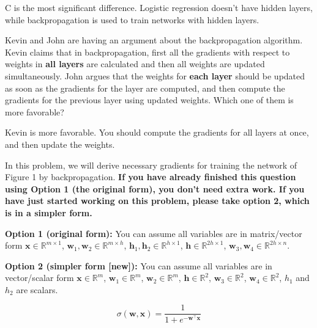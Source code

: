 \documentclass{article}
\newcommand{\R}{\mathbb{R}}
\newcommand{\x}{\mathbf{x}}
\newcommand{\w}{\mathbf{w}}
\newcommand{\h}{\mathbf{h}}
\begin{document}
\begin{probset}
\begin{prob}
\begin{subprobset}
\begin{subprob}
            \begin{soln}
                C is the most significant difference. Logistic regression doesn't have hidden layers, while backpropagation is used to train networks with hidden layers.
            \end{soln}
        \end{subprob}

        \begin{subprob}
            Kevin and John are having an argument about the backpropagation algorithm. Kevin claims that in backpropagation, first all the gradients with respect to weights in \textbf{all layers} are calculated and then all weights are updated simultaneously. John argues that the weights for \textbf{each layer} should be updated as soon as the gradients for the layer are computed, and then compute the gradients for the previous layer using updated weights. Which one of them is more favorable?

            \begin{soln}
                Kevin is more favorable. You should compute the gradients for all layers at once, and then update the weights.
            \end{soln}
        \end{subprob}
    \end{subprobset}
\end{prob}

\begin{prob}
    In this problem, we will derive necessary gradients for training the network of Figure 1 by backpropagation. \textbf{If you have already finished this question using Option 1 (the original form), you don't need extra work. If you have just started working on this problem, please take option 2, which is in a simpler form.}

    \textbf{Option 1 (original form):} You can assume all variables are in matrix/vector form $\x \in
    \R^{m \times 1}$, $\w_1, \w_2 \in \R^{m \times h}$, $\h_1, \h_2 \in \R^{h \times 1}$, $\h \in \R^{2h \times 1}$, $\w_3, \w_4 \in \R^{2h \times n}$.

    \textbf{Option 2 (simpler form [new]):} You can assume all variables are in vector/scalar form $\x \in \R^m$, $\w_1 \in \R^m$, $\w_2 \in \R^m$, $\h \in \R^2$, $\w_3 \in \R^2$, $\w_4 \in \R^2$, $h_1$ and $h_2$ are scalars.

    \[ \sigma(\w, \x) = \frac{1}{1 + e^{-\w^\top \x}} \]


\end{prob}
\end{probset}
\end{document}
